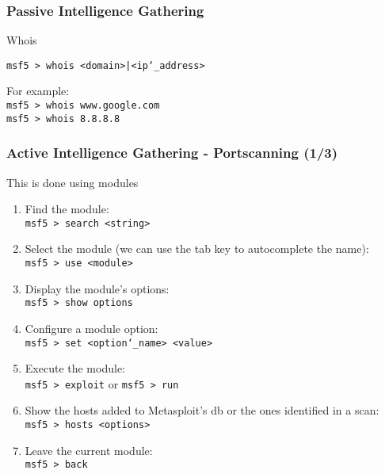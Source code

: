 \documentclass[aspectratio=169]{beamer}
\begin{document}
\begin{frame}
\frametitle{Passive Intelligence Gathering}

Whois

\indent\texttt{msf5 > whois <domain>|<ip\char`\_address>} \\

\vspace{10pt}

For example:\\

\indent\texttt{msf5 > whois www.google.com}\\
\indent\texttt{msf5 > whois 8.8.8.8}\\

\end{frame}

\begin{frame}
\frametitle{Active Intelligence Gathering - Portscanning (1/3)}

This is done using modules

\begin{enumerate}
    \item Find the module: \\
    \texttt{msf5 > search <string>}
    \item Select the module (we can use the tab key to autocomplete the name): \\
    \texttt{msf5 > use <module>} 
    \item Display the module's options: \\
    \texttt{msf5 > show options}
    \item Configure a module option:\\
    \texttt{msf5 > set <option\char`\_name> <value>}
    \item Execute the module: \\
    \texttt{msf5 > exploit} or \texttt{msf5 > run}
    \item Show the hosts added to Metasploit's db or the ones identified in a scan: \\
    \texttt{msf5 > hosts <options>}
    \item Leave the current module: \\
    \texttt{msf5 > back}
\end{enumerate}

\end{frame}
\end{document}
